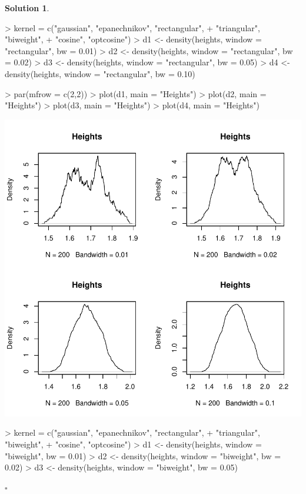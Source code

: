 \documentclass[twoside]{article}
\theoremstyle{definition}
\newtheorem*{solutionT}{Solution}
\newenvironment{solution}{\begin{cBox}\begin{solutionT}}{\hfill{\scriptsize\ensuremath{\square}}\end{solutionT}\end{cBox}}
\theoremstyle{definition}
\begin{document}
\begin{enumerate}
\begin{solution}
\begin{Schunk}
\begin{Sinput}
> kernel = c("gaussian", "epanechnikov", "rectangular",
+                    "triangular", "biweight",
+                    "cosine", "optcosine")
> d1 <- density(heights, window = "rectangular", bw = 0.01)
> d2 <- density(heights, window = "rectangular", bw = 0.02)
> d3 <- density(heights, window = "rectangular", bw = 0.05)
> d4 <- density(heights, window = "rectangular", bw = 0.10)
\end{Sinput}
\end{Schunk}
\begin{Schunk}
\begin{Sinput}
> par(mfrow = c(2,2))
> plot(d1, main = "Heights")
> plot(d2, main = "Heights")
> plot(d3, main = "Heights")
> plot(d4, main = "Heights")
\end{Sinput}
\end{Schunk}
\includegraphics{week3-007}
\begin{Schunk}
\begin{Sinput}
> kernel = c("gaussian", "epanechnikov", "rectangular",
+                    "triangular", "biweight",
+                    "cosine", "optcosine")
> d1 <- density(heights, window = "biweight", bw = 0.01)
> d2 <- density(heights, window = "biweight", bw = 0.02)
> d3 <- density(heights, window = "biweight", bw = 0.05)

\end{Sinput}
\end{Schunk}
\end{solution}
\end{enumerate}
\end{document}

